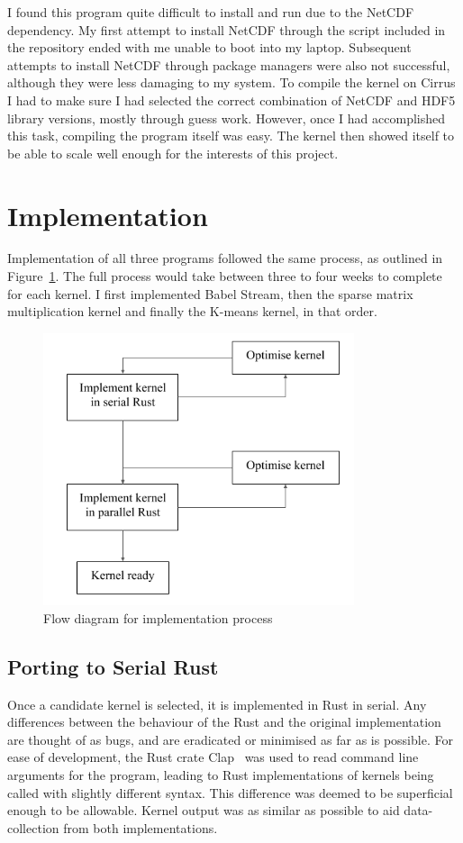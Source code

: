 I found this program quite difficult to install and run due to the NetCDF dependency. My first attempt to install NetCDF through the script included in the repository ended with me unable to boot into my laptop. Subsequent attempts to install NetCDF through package managers were also not successful, although they were less damaging to my system. To compile the kernel on Cirrus I had to make sure I had selected the correct combination of NetCDF and HDF5 library versions, mostly through guess work. However, once I had accomplished this task, compiling the program itself was easy. The kernel then showed itself to be able to scale well enough for the interests of this project.
\section{Implementation}
Implementation of all three programs followed the same process, as outlined in Figure~\ref{fig:imp-flow}. The full process would take between three to four weeks to complete for each kernel. I first implemented Babel Stream, then the sparse matrix multiplication kernel and finally the K-means kernel, in that order.

\begin{figure}
  \center
  \includegraphics[height=8cm]{figs/ImplementationFlow.png}
  \caption{Flow diagram for implementation process}
  \label{fig:imp-flow}
\end{figure}

\subsection{Porting to Serial Rust}
Once a candidate kernel is selected, it is implemented in Rust in serial. Any differences between the  behaviour of the Rust and the original implementation are thought of as bugs, and are eradicated or minimised as far as is possible. For ease of development, the Rust crate Clap~\cite{RustClap} was used to read command line arguments for the program, leading to Rust implementations of kernels being called with slightly different syntax. This difference was deemed to be superficial enough to be allowable. Kernel output was as similar as possible to aid data-collection from both implementations.

